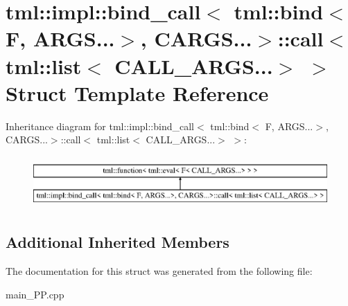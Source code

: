 \hypertarget{structtml_1_1impl_1_1bind__call_3_01tml_1_1bind_3_01F_00_01ARGS_8_8_8_4_00_01CARGS_8_8_8_4_1_1cabeeb463ce0b78f48e1c992fa9dca66e1}{\section{tml\+:\+:impl\+:\+:bind\+\_\+call$<$ tml\+:\+:bind$<$ F, A\+R\+G\+S...$>$, C\+A\+R\+G\+S...$>$\+:\+:call$<$ tml\+:\+:list$<$ C\+A\+L\+L\+\_\+\+A\+R\+G\+S...$>$ $>$ Struct Template Reference}
\label{structtml_1_1impl_1_1bind__call_3_01tml_1_1bind_3_01F_00_01ARGS_8_8_8_4_00_01CARGS_8_8_8_4_1_1cabeeb463ce0b78f48e1c992fa9dca66e1}
}
Inheritance diagram for tml\+:\+:impl\+:\+:bind\+\_\+call$<$ tml\+:\+:bind$<$ F, A\+R\+G\+S...$>$, C\+A\+R\+G\+S...$>$\+:\+:call$<$ tml\+:\+:list$<$ C\+A\+L\+L\+\_\+\+A\+R\+G\+S...$>$ $>$\+:\begin{figure}[H]
\begin{center}
\leavevmode
\includegraphics[height=2.000000cm]{structtml_1_1impl_1_1bind__call_3_01tml_1_1bind_3_01F_00_01ARGS_8_8_8_4_00_01CARGS_8_8_8_4_1_1cabeeb463ce0b78f48e1c992fa9dca66e1}
\end{center}
\end{figure}
\subsection*{Additional Inherited Members}


The documentation for this struct was generated from the following file\+:\begin{DoxyCompactItemize}
\item 
main\+\_\+\+P\+P.\+cpp\end{DoxyCompactItemize}
